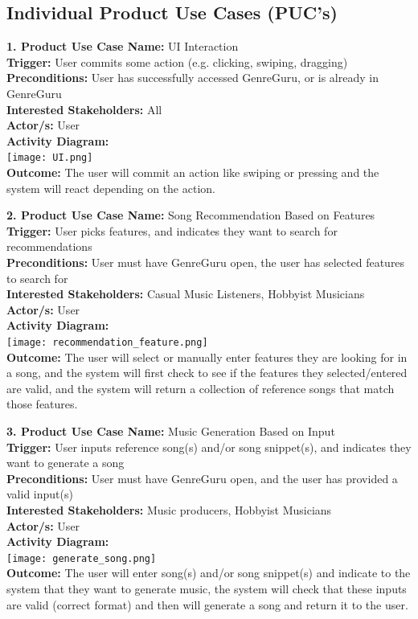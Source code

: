\documentclass[12pt]{article}
\begin{document}
\subsection{Individual Product Use Cases (PUC's)}
\textbf{1. Product Use Case Name:} UI Interaction \\
\textbf{Trigger:} User commits some action (e.g. clicking, swiping, dragging) \\
\textbf{Preconditions:} User has successfully accessed GenreGuru, or is already in GenreGuru \\
\textbf{Interested Stakeholders:} All \\
\textbf{Actor/s:} User \\
\textbf{Activity Diagram:} \\
\texttt{[image: UI.png]} \\
\textbf{Outcome:} The user will commit an action like swiping or pressing and the system will react depending on the action.

\vspace{1cm}

\noindent \textbf{2. Product Use Case Name:} Song Recommendation Based on Features \\
\textbf{Trigger:} User picks features, and indicates they want to search for recommendations \\
\textbf{Preconditions:} User must have GenreGuru open, the user has selected features to search for \\
\textbf{Interested Stakeholders:} Casual Music Listeners, Hobbyist Musicians \\
\textbf{Actor/s:} User \\
\textbf{Activity Diagram:} \\
\texttt{[image: recommendation\_feature.png]} \\
\textbf{Outcome:} The user will select or manually enter features they are looking for in a song, and the system will first check to see if the features they selected/entered are valid, and the system will return a collection of reference songs that match those features.

\vspace{1cm}

\noindent \textbf{3. Product Use Case Name:} Music Generation Based on Input \\
\textbf{Trigger:} User inputs reference song(s) and/or song snippet(s), and indicates they want to generate a song \\
\textbf{Preconditions:} User must have GenreGuru open, and the user has provided a valid input(s) \\
\textbf{Interested Stakeholders:} Music producers, Hobbyist Musicians \\
\textbf{Actor/s:} User \\
\textbf{Activity Diagram:} \\
\texttt{[image: generate\_song.png]} \\
\textbf{Outcome:} The user will enter song(s) and/or song snippet(s) and indicate to the system that they want to generate music, the system will check that these inputs are valid (correct format) and then will generate a song and return it to the user.
\end{document}
